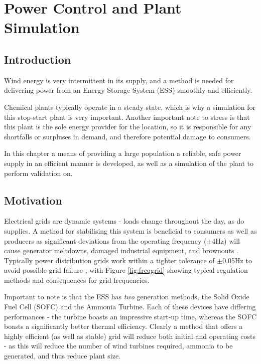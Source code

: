 
\section{Power Control and Plant Simulation}
\label{sec:powercontrol}
\subsection{Introduction}
\label{sec:pwrintro}

Wind energy is very intermittent in its supply, and a method is needed for delivering power from an Energy Storage System (ESS) smoothly and efficiently.

Chemical plants typically operate in a steady state, which is why a simulation for this stop-start plant is very important.
Another important note to stress is that this plant is the sole energy provider for the location, so it is responsible for any shortfalls or surpluses in demand, and therefore potential damage to consumers.

In this chapter a means of providing a large population a reliable, safe power supply in an efficient manner is developed, as well as a simulation of the plant to perform validation on.

\subsection{Motivation}

Electrical grids are dynamic systems - loads change throughout the day, as do supplies.
A method for stabilising this system is beneficial to consumers as well as producers as significant deviations from the operating frequency ($\pm$4Hz) will cause generator meltdowns, damaged industrial equipment, and brownouts \cite{power:freqs}.
Typically power distribution grids work within a tighter tolerance of $\pm$0.05Hz to avoid possible grid failure \cite{power:freqs}, with Figure \ref{fig:freqgrid} showing typical regulation methods and consequences for grid frequencies.

Important to note is that the ESS has \emph{two} generation methods, the Solid Oxide Fuel Cell (SOFC) and the Ammonia Turbine.
Each of these devices have differing performances - the turbine boasts an impressive start-up time, whereas the SOFC boasts a significantly better thermal efficiency.
Clearly a method that offers a highly efficient (as well as stable) grid will reduce both initial and operating costs - as this will reduce the number of wind turbines required, ammonia to be generated, and thus reduce plant size.

